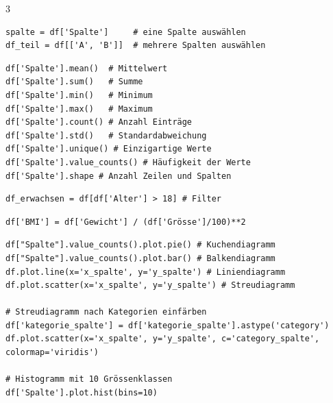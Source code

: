 \begin{landscape}
\begin{multicols*}{3}
    \begin{cheatSheetBox}[title=Spalten auswählen]
      \begin{lstlisting}
spalte = df['Spalte']     # eine Spalte auswählen
df_teil = df[['A', 'B']]  # mehrere Spalten auswählen
\end{lstlisting}
    \end{cheatSheetBox}

    \begin{cheatSheetBox}[title=Tabellen-Statistiken]
      \begin{lstlisting}
df['Spalte'].mean()  # Mittelwert
df['Spalte'].sum()   # Summe
df['Spalte'].min()   # Minimum
df['Spalte'].max()   # Maximum
df['Spalte'].count() # Anzahl Einträge
df['Spalte'].std()   # Standardabweichung
df['Spalte'].unique() # Einzigartige Werte
df['Spalte'].value_counts() # Häufigkeit der Werte
df['Spalte'].shape # Anzahl Zeilen und Spalten
\end{lstlisting}

    \end{cheatSheetBox}

    \begin{cheatSheetBox}[title=Zeilen filtern]
      \begin{lstlisting}
df_erwachsen = df[df['Alter'] > 18] # Filter 
\end{lstlisting}
    \end{cheatSheetBox}

    \begin{cheatSheetBox}[title=Neue Spalte erstellen]
      \begin{lstlisting}
df['BMI'] = df['Gewicht'] / (df['Grösse']/100)**2
\end{lstlisting}
    \end{cheatSheetBox}

    \begin{cheatSheetBox}[title=Grafiken erstellen]
      \begin{lstlisting}
df["Spalte"].value_counts().plot.pie() # Kuchendiagramm
df["Spalte"].value_counts().plot.bar() # Balkendiagramm
df.plot.line(x='x_spalte', y='y_spalte') # Liniendiagramm
df.plot.scatter(x='x_spalte', y='y_spalte') # Streudiagramm

# Streudiagramm nach Kategorien einfärben
df['kategorie_spalte'] = df['kategorie_spalte'].astype('category') 
df.plot.scatter(x='x_spalte', y='y_spalte', c='category_spalte', colormap='viridis')

# Histogramm mit 10 Grössenklassen
df['Spalte'].plot.hist(bins=10)


\end{lstlisting}
\end{cheatSheetBox}
\end{multicols*}
\end{landscape}
